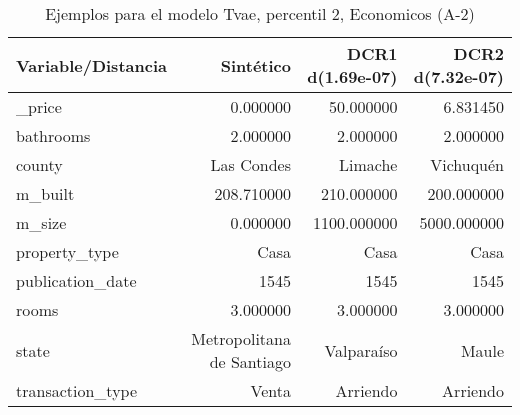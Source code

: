 \begin{table}[H]
\centering
\fontsize{10}{14}\selectfont
\caption{Ejemplos para el modelo Tvae, percentil 2, Economicos (A-2)}
\label{table-example-economicos-a-2-tvae-2p}
\begin{tabular}{|l|r|r|r|}
\hline
\rowcolor[gray]{0.8}
Variable/Distancia & Sintético & DCR1 d(1.69e-07) & DCR2 d(7.32e-07) \\
\hline \_price & \cellcolor[rgb]{0.9, 0.54, 0.52} 0.000000 & 50.000000 & 6.831450 \\
\hline bathrooms & \cellcolor[rgb]{0.9, 0.54, 0.52} 2.000000 & \cellcolor[rgb]{0.9, 0.54, 0.52} 2.000000 & \cellcolor[rgb]{0.9, 0.54, 0.52} 2.000000 \\
\hline county & \cellcolor[rgb]{0.9, 0.54, 0.52} Las Condes & Limache & Vichuquén \\
\hline m\_built & \cellcolor[rgb]{0.9, 0.54, 0.52} 208.710000 & 210.000000 & 200.000000 \\
\hline m\_size & \cellcolor[rgb]{0.9, 0.54, 0.52} 0.000000 & 1100.000000 & 5000.000000 \\
\hline property\_type & \cellcolor[rgb]{0.9, 0.54, 0.52} Casa & \cellcolor[rgb]{0.9, 0.54, 0.52} Casa & \cellcolor[rgb]{0.9, 0.54, 0.52} Casa \\
\hline publication\_date & \cellcolor[rgb]{0.9, 0.54, 0.52} 1545 & \cellcolor[rgb]{0.9, 0.54, 0.52} 1545 & \cellcolor[rgb]{0.9, 0.54, 0.52} 1545 \\
\hline rooms & \cellcolor[rgb]{0.9, 0.54, 0.52} 3.000000 & \cellcolor[rgb]{0.9, 0.54, 0.52} 3.000000 & \cellcolor[rgb]{0.9, 0.54, 0.52} 3.000000 \\
\hline state & \cellcolor[rgb]{0.9, 0.54, 0.52} Metropolitana de Santiago & Valparaíso & Maule \\
\hline transaction\_type & \cellcolor[rgb]{0.9, 0.54, 0.52} Venta & Arriendo & Arriendo \\
\hline
\end{tabular}
\end{table}
